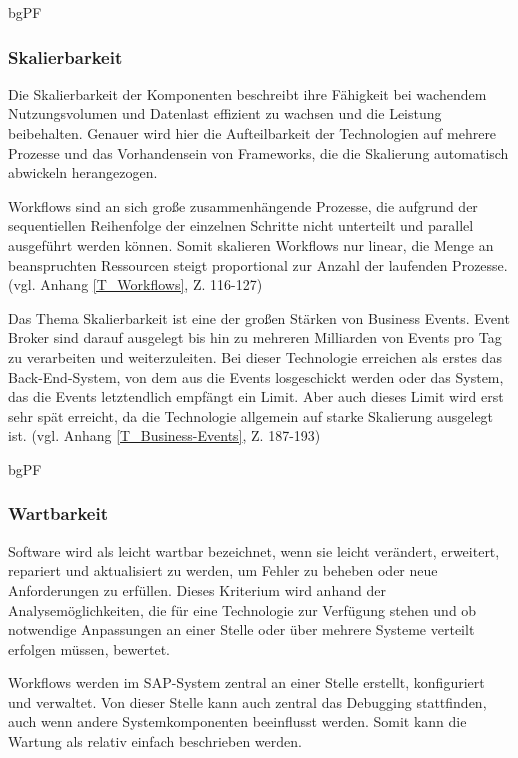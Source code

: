 bgPF

\subsubsection{Skalierbarkeit}

Die Skalierbarkeit der Komponenten beschreibt ihre Fähigkeit bei wachendem Nutzungsvolumen und Datenlast effizient zu wachsen und die Leistung beibehalten. Genauer wird hier die Aufteilbarkeit der Technologien auf mehrere Prozesse und das Vorhandensein von Frameworks, die die Skalierung automatisch abwickeln herangezogen.

Workflows sind an sich gro{\ss}e zusammenhängende Prozesse, die aufgrund der sequentiellen Reihenfolge der einzelnen Schritte nicht unterteilt und \zB parallel ausgeführt werden können. Somit skalieren Workflows nur linear, die Menge an beanspruchten Ressourcen steigt proportional zur Anzahl der laufenden Prozesse. (vgl. Anhang \ref{T_Workflows}, Z. 116-127)

Das Thema Skalierbarkeit ist eine der gro{\ss}en Stärken von Business Events. Event Broker sind darauf ausgelegt bis hin zu mehreren Milliarden von Events pro Tag zu verarbeiten und weiterzuleiten. Bei dieser Technologie erreichen als erstes das Back-End-System, von dem aus die Events losgeschickt werden oder das System, das die Events letztendlich empfängt ein Limit. Aber auch dieses Limit wird erst sehr spät erreicht, da die Technologie allgemein auf starke Skalierung ausgelegt ist. (vgl. Anhang \ref{T_Business-Events}, Z. 187-193)

bgPF

\subsubsection{Wartbarkeit}

Software wird als leicht wartbar bezeichnet, wenn sie leicht verändert, erweitert, repariert und aktualisiert zu werden, um Fehler zu beheben oder neue Anforderungen zu erfüllen. Dieses Kriterium wird anhand der Analysemöglichkeiten, die für eine Technologie zur Verfügung stehen und ob notwendige Anpassungen an einer Stelle oder über mehrere Systeme verteilt erfolgen müssen, bewertet.

Workflows werden im SAP-System zentral an einer Stelle erstellt, konfiguriert und verwaltet. Von dieser Stelle kann auch zentral das Debugging stattfinden, auch wenn andere Systemkomponenten beeinflusst werden. Somit kann die Wartung als relativ einfach beschrieben werden. 

